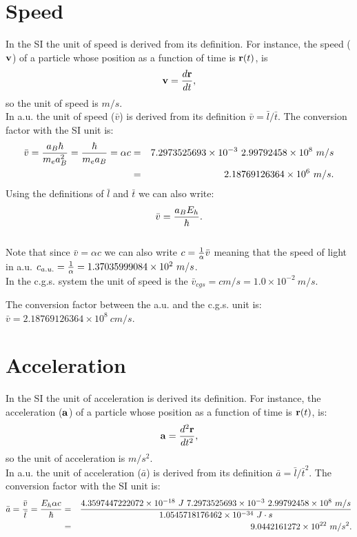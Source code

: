 \documentclass[12pt,a4paper]{article}
\def\hbarf{1.0545718176462\times 10^{-34}}
\def\cspeed{2.99792458\times 10^{8}}
\def\alphaf{7.2973525693\times 10^{-3}}
\def\barv{2.18769126364\times 10^{6}}
\def\bara{9.0442161272\times 10^{22}}
\def\baru{4.3597447222072\times 10^{-18}}
\def\cmtom{1.0\times 10^{-2}}
\def\barvcgs{2.18769126364\times 10^{8}}
\def\cspeedau{1.37035999084\times 10^{2}}
\begin{document}
\newpage
\section{\color{coral}Speed}
In the SI the unit of speed is derived from its definition.
For instance, the speed (${\bf v}$) of a particle 
whose position as a function of time is ${\bf r}(t)$, is
\begin{equation}
{\bf v}={d{\bf r} \over dt},
\end{equation} 
so the unit of speed is $m/s$.
\\

{\color{web-blue} In a.u. the unit of speed ($\bar v$) is derived 
from its definition $\bar v = \bar l / \bar t$. The conversion factor
with the SI unit is:
\begin{eqnarray}
\bar v ={a_B \hbar \over m_e a_B^2}={\hbar \over m_e a_B}=\alpha c&=&
 {\alphaf\  \cspeed\ m/s}\nonumber \\ 
&=&\barv\ m/s.
\end{eqnarray}
Using the definitions of $\bar l$ and $\bar t$ we can also write:
\begin{equation}
\bar v={a_B E_h \over \hbar}.
\end{equation}
\\
Note that since $\bar v= \alpha c$ we can also write 
$c={1\over \alpha} \bar v$ meaning that the speed of light in a.u. 
$c_{a.u.}={1\over\alpha}=\cspeedau\ m/s$.
}
\\

{\color{orange} In the c.g.s. system the unit of speed is the 
$\bar v_{cgs}=cm/s = \cmtom\ m/s$.
\\
}

{\color{green} The conversion factor between the a.u. and the c.g.s. unit is:
$\bar v=\barvcgs\ cm/s$.
\\
}

\newpage
\section{\color{coral}Acceleration}
In the SI the unit of acceleration is derived its  
definition. For instance, the acceleration (${\bf a}$) of a particle whose
position as a function of time is ${\bf r}(t)$, is: 
\begin{equation}
{\bf a}={d^2{\bf r} \over dt^2},
\end{equation} 
so the unit of acceleration is $m/s^2$.
\\

{\color{web-blue} In a.u. the unit of acceleration ($\bar a$) is derived 
from its definition $\bar a = \bar l / \bar t^2$. The conversion factor
with the SI unit is:
\begin{eqnarray}
\bar a = {\bar v \over \bar t}={E_h \alpha c \over \hbar}&=& 
{\baru\ J\ \alphaf\ \cspeed\ m/s \over \hbarf\ J\cdot s}\nonumber \\
&=&\bara\ m/s^2.
\end{eqnarray}
\\
}
\end{document}
